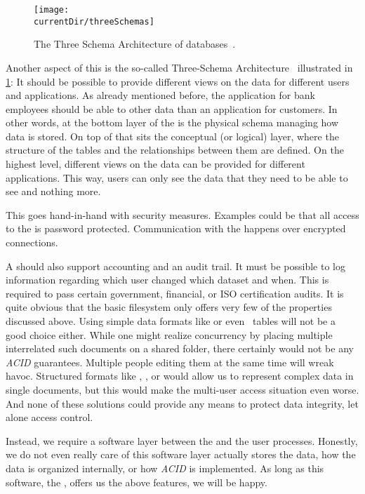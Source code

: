 \begin{figure}%
\centering%
\texttt{[image: \\currentDir/threeSchemas]}%
\caption{The Three Schema Architecture of databases~\cite{AXSSGDMS1978FRODMS,TK1978TAXSDFROTSGODMS,BFJKMRGRT1985RMFDSDAFTGDOTAXSDSSG,SS2005EIDDDFDBI}.}%
\label{fig:threeSchemas}%
\end{figure}

Another aspect of this is the so-called Three-Schema Architecture~\cite{AXSSGDMS1978FRODMS,TK1978TAXSDFROTSGODMS,BFJKMRGRT1985RMFDSDAFTGDOTAXSDSSG,SS2005EIDDDFDBI} illustrated in \cref{fig:threeSchemas}:
It should be possible to provide different views on the data for different users and applications.
As already mentioned before, the application for bank employees should be able to  other data than an application for customers.
In other words, at the bottom layer of the  is the physical schema managing how data is stored.
On top of that sits the conceptual (or logical) layer, where the structure of the tables and the relationships between them are defined.
On the highest level, different views on the data can be provided for different applications.
This way, users can only see the data that they need to be able to see and nothing more.

This goes hand-in-hand with security measures.
Examples could be that all access to the  is password protected.
Communication with the  happens over encrypted connections.

A  should also support accounting and an audit trail.
It must be possible to log information regarding which user changed which dataset and when.
This is required to pass certain government, financial, or ISO certification audits.
\endhsection%
%
%
It is quite obvious that the basic filesystem only offers very few of the properties discussed above.
Using simple data formats like  or even \microsoftExcel\ tables will not be a good choice either.
While one might realize concurrency by placing multiple interrelated such documents on a shared folder, there certainly would not be any \emph{ACID} guarantees.
Multiple people editing them at the same time will wreak havoc.
Structured formats like , , or  would allow us to represent complex data in single documents, but this would make the multi-user access situation even worse.
And none of these solutions could provide any means to protect data integrity, let alone access control.

Instead, we require a software layer between the  and the user processes.
Honestly, we do not even really care of this software layer actually stores the data, how the data is organized internally, or how \emph{ACID} is implemented.
As long as this software, the , offers us the above features, we will be happy.%
\endhsection%
\endhsection%
%
